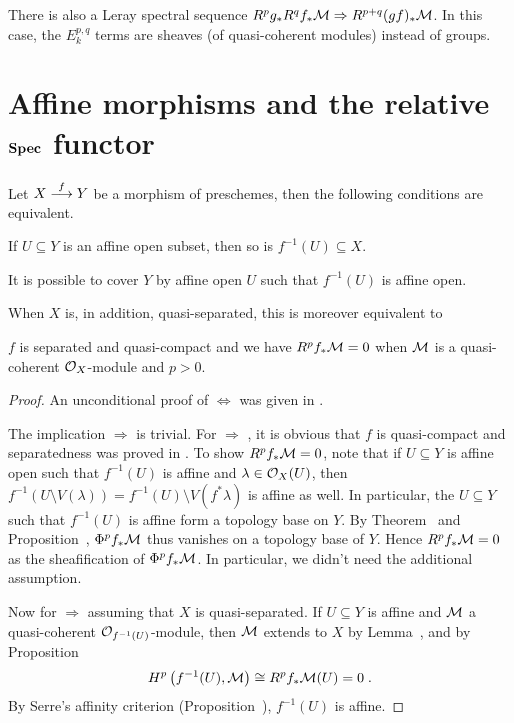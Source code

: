 \documentclass[a4paper,parskip=half,numbers=enddot, DIV=12]{scrreprt}
\begin{document}
There is also a Leray spectral sequence $R^pg_*R^qf_*\Mm\converge R^{p+q}(gf)_*\Mm$. In this case, the $E_k^{p,q}$ terms are sheaves (of quasi-coherent modules) instead of groups.

\section{Affine morphisms and the relative \texorpdfstring{$\operatorname{\mathbf{Spec}}$}{Spec} functor}
\begin{prop}
	Let $X\morphism[f]Y$ be a morphism of preschemes, then the following conditions are equivalent.
	\begin{alphanumerate}
		\item If $U\subseteq Y$ is an affine open subset, then so is $f^{-1}(U)\subseteq X$.
		\item It is possible to cover $Y$ by affine open $U$ such that $f^{-1}(U)$ is affine open.
	\end{alphanumerate}
	When $X$ is, in addition, quasi-separated, this is moreover equivalent to
	\begin{alphanumerate}\setcounter{enumi}{2}
		\item $f$ is separated and quasi-compact and we have $R^pf_*\mathcal{M}=0$ when $\mathcal{M}$ is a quasi-coherent $\mathcal{O}_X$-module and $p>0$.
	\end{alphanumerate}
\end{prop}
\begin{proof}
	An unconditional proof of  $\Leftrightarrow$  was given in \cite[Lemma~2.5.1]{alggeo1}.
	
	The implication  $\Rightarrow$  is trivial. For  $\Rightarrow$ , it is obvious that $f$ is quasi-compact and separatedness was proved in \cite[Fact~2.6.1]{alggeo1}. To show $R^pf_*\mathcal{M}=0$, note that if $U\subseteq Y$ is affine open such that $f^{-1}(U)$ is affine and $\lambda\in\mathcal{O}_X(U)$, then $f^{-1}(U\setminus V(\lambda))=f^{-1}(U)\setminus V(f^*\lambda)$ is affine as well. In particular, the $U\subseteq Y$ such that $f^{-1}(U)$ is affine form a topology base on $Y$.  By Theorem~ and Proposition~, $\Phi^pf_*\mathcal{M}$ thus vanishes on a topology base of $Y$. Hence $R^pf_*\mathcal{M}=0$ as the sheafification of  $\Phi^pf_*\mathcal{M}$. In particular, we didn't need the additional assumption.
	
	Now for  $\Rightarrow$  assuming that $X$ is quasi-separated. If $U\subseteq Y$ is affine and $\mathcal{M}$ a quasi-coherent $\mathcal{O}_{f^{-1}(U)}$-module, then $\mathcal{M}$ extends to $X$ by Lemma~, and by Proposition~
	\begin{align*}
		H^p\left(f^{-1}(U),\mathcal{M}\right)\cong R^pf_*\mathcal{M}(U)=0\;.
	\end{align*}
	By Serre's affinity criterion (Proposition~), $f^{-1}(U)$ is affine.
\end{proof}
\end{document}
